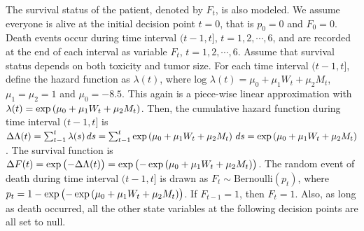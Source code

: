 The survival status of the patient, denoted by $F_t$, is also modeled. We assume everyone is alive at the initial decision point $t=0$, that is $p_0 =0$ and $F_0 = 0$.  Death events occur during time interval $(t-1, t]$, $t = 1, 2, \cdots, 6$, and are recorded at the end of each interval as variable $F_t$, $t=1,2, \cdots, 6$. Assume that survival status depends on both toxicity and tumor size. For each time interval $(t-1, t]$, define the hazard function as $\lambda(t)$, where $\text{log } \lambda(t) = \mu_0 + \mu_1 W_t + \mu_2 M_t$, $\mu_1 = \mu_2 = 1$ and $\mu_0 = -8.5$. This again is a piece-wise linear approximation with $\lambda(t) = \text{exp}\left( \mu_0 + \mu_1 W_t + \mu_2 M_t\right)$. Then, the cumulative hazard function during time interval $(t-1, t]$ is
$\Delta \Lambda(t) = \sum_{t-1}^t \lambda(s) \,ds
= \sum_{t-1}^t \exp\left( \mu_0 + \mu_1 W_t + \mu_2 M_t\right) \,ds
=\exp\left( \mu_0 + \mu_1 W_t + \mu_2 M_t\right)$.  The survival function is $\Delta F(t) = \exp \left( - \Delta \Lambda(t)\right) = \exp \left( - \exp\left( \mu_0 + \mu_1 W_t + \mu_2 M_t\right) \right)$.
The random event of death during time interval $(t-1, t]$ is drawn as $F_t \sim \text{Bernoulli}(p_t) $, where \\
$p_t =1 - \text{exp}\left( - \exp\left( \mu_0 + \mu_1 W_t + \mu_2 M_t\right) \right)$.
If $F_{t-1} = 1$, then $F_t =1$. Also, as long as death occurred, all the other state variables at the following decision points are all set to null.\\

